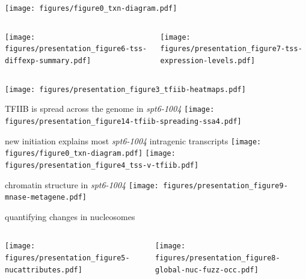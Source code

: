 \documentclass[aspectratio=169]{beamer}
\begin{document}
\begin{frame}
    \centering
    \texttt{[image: figures/figure0\_txn-diagram.pdf]}
    \begin{columns}
        \begin{column}{0.5\textwidth}
            \centering
            \texttt{[image: figures/presentation\_figure6-tss-diffexp-summary.pdf]}
        \end{column}
        \begin{column}{0.5\textwidth}
            \centering
            \pause
            \texttt{[image: figures/presentation\_figure7-tss-expression-levels.pdf]}
        \end{column}
    \end{columns}
\end{frame}

\begin{frame}
\centering
\texttt{[image: figures/presentation\_figure3\_tfiib-heatmaps.pdf]}
\end{frame}

\begin{frame}{TFIIB is spread across the genome in \textit{spt6-1004}}
\texttt{[image: figures/presentation\_figure14-tfiib-spreading-ssa4.pdf]}
\end{frame}

\begin{frame}{new initiation explains most \textit{spt6-1004} intragenic transcripts}
    \centering
    \texttt{[image: figures/figure0\_txn-diagram.pdf]}
    \texttt{[image: figures/presentation\_figure4\_tss-v-tfiib.pdf]}
\end{frame}

\begin{frame}{chromatin structure in \textit{spt6-1004}}
\texttt{[image: figures/presentation\_figure9-mnase-metagene.pdf]}
\end{frame}

\begin{frame}{quantifying changes in nucleosomes}
    \begin{columns}
        \begin{column}{0.5\textwidth}
            \centering
            \texttt{[image: figures/presentation\_figure5-nucattributes.pdf]}
        \end{column}
        \begin{column}{0.5\textwidth}
            \centering
            \texttt{[image: figures/presentation\_figure8-global-nuc-fuzz-occ.pdf]}
        \end{column}
    \end{columns}
\end{frame}
\end{document}
